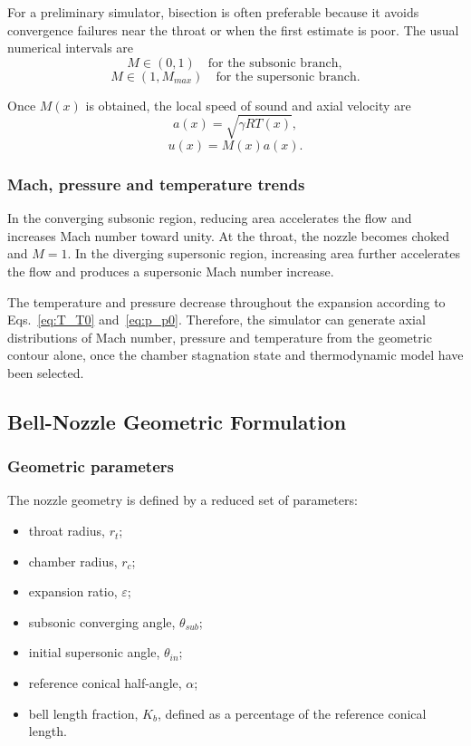\documentclass[journal,article,submit,oneauthor]{Definitions/mdpi}
\begin{document}
For a preliminary simulator, bisection is often preferable because it avoids convergence failures near the throat or when the first estimate is poor. The usual numerical intervals are
\begin{equation}
M\in(0,1) \quad \text{for the subsonic branch},
\end{equation}
\begin{equation}
M\in(1,M_{max}) \quad \text{for the supersonic branch}.
\end{equation}

Once $M(x)$ is obtained, the local speed of sound and axial velocity are
\begin{equation}
a(x)=\sqrt{\gamma R T(x)},
\end{equation}
\begin{equation}
u(x)=M(x)a(x).
\label{eq:velocity}
\end{equation}

\subsubsection{Mach, pressure and temperature trends}

In the converging subsonic region, reducing area accelerates the flow and increases Mach number toward unity. At the throat, the nozzle becomes choked and $M=1$. In the diverging supersonic region, increasing area further accelerates the flow and produces a supersonic Mach number increase.

The temperature and pressure decrease throughout the expansion according to Eqs.~\eqref{eq:T_T0} and~\eqref{eq:p_p0}. Therefore, the simulator can generate axial distributions of Mach number, pressure and temperature from the geometric contour alone, once the chamber stagnation state and thermodynamic model have been selected.

\subsection{Bell-Nozzle Geometric Formulation}

\subsubsection{Geometric parameters}

The nozzle geometry is defined by a reduced set of parameters:
\begin{itemize}
    \item throat radius, $r_t$;
    \item chamber radius, $r_c$;
    \item expansion ratio, $\varepsilon$;
    \item subsonic converging angle, $\theta_{sub}$;
    \item initial supersonic angle, $\theta_{in}$;
    \item reference conical half-angle, $\alpha$;
    \item bell length fraction, $K_b$, defined as a percentage of the reference conical length.
\end{itemize}
\end{document}
